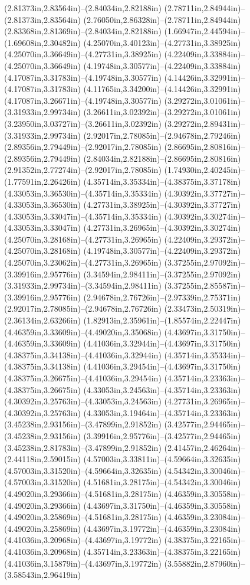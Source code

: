 (2.81373in,2.83564in)--(2.84034in,2.82188in) (2.78711in,2.84944in)--(2.81373in,2.83564in) (2.76050in,2.86328in)--(2.78711in,2.84944in) (2.83368in,2.81369in)--(2.84034in,2.82188in) (1.66947in,2.44594in)--(1.69608in,2.30482in) (4.25070in,3.40123in)--(4.27731in,3.38925in) (4.25070in,3.36649in)--(4.27731in,3.38925in) (4.22409in,3.33884in)--(4.25070in,3.36649in) (4.19748in,3.30577in)--(4.22409in,3.33884in) (4.17087in,3.31783in)--(4.19748in,3.30577in) (4.14426in,3.32991in)--(4.17087in,3.31783in) (4.11765in,3.34200in)--(4.14426in,3.32991in) (4.17087in,3.26671in)--(4.19748in,3.30577in) (3.29272in,3.01061in)--(3.31933in,2.99734in) (3.26611in,3.02392in)--(3.29272in,3.01061in) (3.23950in,3.03727in)--(3.26611in,3.02392in) (3.29272in,2.89431in)--(3.31933in,2.99734in) (2.92017in,2.78085in)--(2.94678in,2.79246in) (2.89356in,2.79449in)--(2.92017in,2.78085in) (2.86695in,2.80816in)--(2.89356in,2.79449in) (2.84034in,2.82188in)--(2.86695in,2.80816in) (2.91352in,2.77274in)--(2.92017in,2.78085in) (1.74930in,2.40245in)--(1.77591in,2.26426in) (4.35714in,3.35334in)--(4.38375in,3.37178in) (4.33053in,3.36530in)--(4.35714in,3.35334in) (4.30392in,3.37727in)--(4.33053in,3.36530in) (4.27731in,3.38925in)--(4.30392in,3.37727in) (4.33053in,3.33047in)--(4.35714in,3.35334in) (4.30392in,3.30274in)--(4.33053in,3.33047in) (4.27731in,3.26965in)--(4.30392in,3.30274in) (4.25070in,3.28168in)--(4.27731in,3.26965in) (4.22409in,3.29372in)--(4.25070in,3.28168in) (4.19748in,3.30577in)--(4.22409in,3.29372in) (4.25070in,3.23062in)--(4.27731in,3.26965in) (3.37255in,2.97092in)--(3.39916in,2.95776in) (3.34594in,2.98411in)--(3.37255in,2.97092in) (3.31933in,2.99734in)--(3.34594in,2.98411in) (3.37255in,2.85587in)--(3.39916in,2.95776in) (2.94678in,2.76726in)--(2.97339in,2.75371in) (2.92017in,2.78085in)--(2.94678in,2.76726in) (2.33473in,2.50319in)--(2.36134in,2.63266in) (1.82913in,2.35961in)--(1.85574in,2.22447in) (4.46359in,3.33609in)--(4.49020in,3.35068in) (4.43697in,3.31750in)--(4.46359in,3.33609in) (4.41036in,3.32944in)--(4.43697in,3.31750in) (4.38375in,3.34138in)--(4.41036in,3.32944in) (4.35714in,3.35334in)--(4.38375in,3.34138in) (4.41036in,3.29454in)--(4.43697in,3.31750in) (4.38375in,3.26675in)--(4.41036in,3.29454in) (4.35714in,3.23363in)--(4.38375in,3.26675in) (4.33053in,3.24563in)--(4.35714in,3.23363in) (4.30392in,3.25763in)--(4.33053in,3.24563in) (4.27731in,3.26965in)--(4.30392in,3.25763in) (4.33053in,3.19464in)--(4.35714in,3.23363in) (3.45238in,2.93156in)--(3.47899in,2.91852in) (3.42577in,2.94465in)--(3.45238in,2.93156in) (3.39916in,2.95776in)--(3.42577in,2.94465in) (3.45238in,2.81783in)--(3.47899in,2.91852in) (2.41457in,2.46264in)--(2.44118in,2.59015in) (4.57003in,3.33811in)--(4.59664in,3.32635in) (4.57003in,3.31520in)--(4.59664in,3.32635in) (4.54342in,3.30046in)--(4.57003in,3.31520in) (4.51681in,3.28175in)--(4.54342in,3.30046in) (4.49020in,3.29366in)--(4.51681in,3.28175in) (4.46359in,3.30558in)--(4.49020in,3.29366in) (4.43697in,3.31750in)--(4.46359in,3.30558in) (4.49020in,3.25869in)--(4.51681in,3.28175in) (4.46359in,3.23084in)--(4.49020in,3.25869in) (4.43697in,3.19772in)--(4.46359in,3.23084in) (4.41036in,3.20968in)--(4.43697in,3.19772in) (4.38375in,3.22165in)--(4.41036in,3.20968in) (4.35714in,3.23363in)--(4.38375in,3.22165in) (4.41036in,3.15879in)--(4.43697in,3.19772in) (3.55882in,2.87960in)--(3.58543in,2.96419in) 
